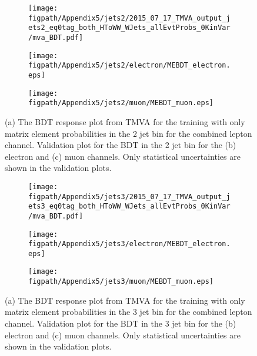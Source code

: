 \begin{figure}[!hbt]
    \centering
    \begin{subfigure}[t]{0.317\textwidth}
        \texttt{[image: \\figpath/Appendix5/jets2/2015\_07\_17\_TMVA\_output\_jets2\_eq0tag\_both\_HToWW\_WJets\_allEvtProbs\_0KinVar/mva\_BDT.pdf]}
        \caption{}
        \label{fig:MEBDT_Response_2j0B_TMVA}
    \end{subfigure}
    \begin{subfigure}[t]{0.317\textwidth}
        \texttt{[image: \\figpath/Appendix5/jets2/electron/MEBDT\_electron.eps]}
        \caption{}
        \label{fig:MEBDT_jets2_electron_noSys}
    \end{subfigure}
    \begin{subfigure}[t]{0.317\textwidth}
        \texttt{[image: \\figpath/Appendix5/jets2/muon/MEBDT\_muon.eps]}
        \caption{}
        \label{fig:MEBDT_jets2_muon_noSys}
    \end{subfigure}
    \caption{(a) The BDT response plot from TMVA for the training with only matrix element probabilities in the 2 jet bin for the combined lepton channel. Validation plot for the BDT in the 2 jet bin for the (b) electron and (c) muon channels. Only statistical uncertainties are shown in the validation plots.}
    \label{fig:MEBDT_Comparison_jets2}
\end{figure}

\begin{figure}[!hbt]
    \centering
    \begin{subfigure}[t]{0.317\textwidth}
        \texttt{[image: \\figpath/Appendix5/jets3/2015\_07\_17\_TMVA\_output\_jets3\_eq0tag\_both\_HToWW\_WJets\_allEvtProbs\_0KinVar/mva\_BDT.pdf]}
        \caption{}
        \label{fig:MEBDT_Response_3j0B_TMVA}
    \end{subfigure}
    \begin{subfigure}[t]{0.317\textwidth}
        \texttt{[image: \\figpath/Appendix5/jets3/electron/MEBDT\_electron.eps]}
        \caption{}
        \label{fig:MEBDT_jets3_electron_noSys}
    \end{subfigure}
    \begin{subfigure}[t]{0.317\textwidth}
        \texttt{[image: \\figpath/Appendix5/jets3/muon/MEBDT\_muon.eps]}
        \caption{}
        \label{fig:MEBDT_jets3_muon_noSys}
    \end{subfigure}
    \caption{(a) The BDT response plot from TMVA for the training with only matrix element probabilities in the 3 jet bin for the combined lepton channel. Validation plot for the BDT in the 3 jet bin for the (b) electron and (c) muon channels. Only statistical uncertainties are shown in the validation plots.}
    \label{fig:MEBDT_Comparison_jets2}
\end{figure}

